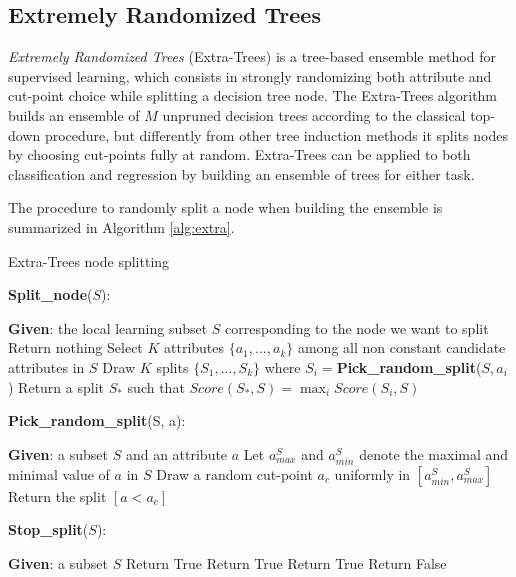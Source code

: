  
\subsection{Extremely Randomized Trees}\label{s:extra-trees}
\textit{Extremely Randomized Trees} (Extra-Trees) \cite{geurts2006extremely}
is a tree-based ensemble method for supervised learning, which consists in 
strongly randomizing both attribute and cut-point choice while splitting a 
decision tree node. 
The Extra-Trees algorithm builds an ensemble of $M$ unpruned decision trees 
according to the classical top-down procedure, but differently from other tree 
induction methods it splits nodes by choosing cut-points fully at random. 
Extra-Trees can be applied to both classification and regression by building 
an ensemble of trees for either task.

The procedure to randomly split a node when building the ensemble is summarized 
in Algorithm \ref{alg:extra}.
%
\begin{algorithm}
    \caption{Extra-Trees node splitting}
    \label{alg:extra}
    \begin{algorithmic}
	\STATE \textbf{Split\_node}($S$):
	    \begin{ALC@g}
		\STATE \textbf{Given}: the local learning subset $S$ corresponding to the node we want to split
		    \STATE Return nothing
		\ELSE{} 
		    \STATE Select $K$ attributes $\{a_1, ..., a_k\}$ among all non constant candidate attributes in $S$
		    \STATE Draw $K$ splits $\{S_1, ..., S_k\}$ where $S_i=$\textbf{Pick\_random\_split}($S, a_i$)
		    \STATE Return a split $S_*$ such that $Score(S_*, S)=\max_{i}Score(S_i, S)$
		\ENDIF
	    \end{ALC@g}
	\STATE
	\STATE \textbf{Pick\_random\_split}(S, a):
	    \begin{ALC@g}
		\STATE \textbf{Given}: a subset $S$ and an attribute $a$
		\STATE Let $a_{max}^S$ and $a_{min}^S$ denote the maximal and minimal value of $a$ in $S$
		\STATE Draw a random cut-point $a_c$ uniformly in $[a_{min}^S, a_{max}^S]$
		\STATE Return the split $[a < a_c]$
	    \end{ALC@g}
	\STATE
	\STATE \textbf{Stop\_split}($S$):
	    \begin{ALC@g}
		\STATE \textbf{Given}: a subset $S$
		 \STATE Return True \ENDIF
		 \STATE Return True \ENDIF
		 \STATE Return True \ENDIF
		\STATE Return False
	    \end{ALC@g}
    \end{algorithmic}
\end{algorithm}
%


